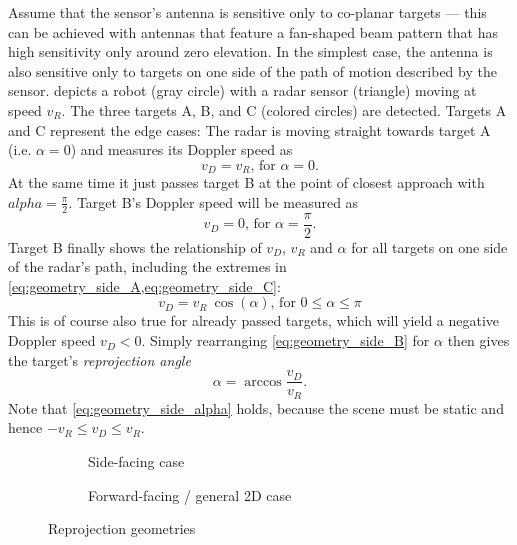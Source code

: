 Assume that the sensor's antenna is sensitive only to co-planar targets --- this can be achieved with antennas that feature a fan-shaped beam pattern that has high sensitivity only around zero elevation. In the simplest case, the antenna is also sensitive only to targets on one side of the path of motion described by the sensor.  depicts a robot (gray circle) with a radar sensor (triangle) moving at speed $v_R$. The three targets A, B, and C (colored circles) are detected. Targets A and C represent the edge cases: The radar is moving straight towards target A (i.e. $\alpha=0$) and measures its Doppler speed as
\begin{equation} \label{eq:geometry_side_A}
    v_D = v_R\text{, for }\alpha=0.
\end{equation}
At the same time it just passes target B at the point of closest approach with $alpha=\frac{\pi}{2}$. Target B's Doppler speed will be measured as
\begin{equation} \label{eq:geometry_side_C}
    v_D = 0\text{, for }\alpha=\frac{\pi}{2}.
\end{equation}
Target B finally shows the relationship of $v_D$, $v_R$ and $\alpha$ for all targets on one side of the radar's path, including the extremes in \cref{eq:geometry_side_A,eq:geometry_side_C}:
\begin{equation} \label{eq:geometry_side_B}
    v_D = v_R~\cos(\alpha)\text{, for }0 \leq \alpha \leq \pi
\end{equation}
This is of course also true for already passed targets, which will yield a negative Doppler speed $v_D < 0$. Simply rearranging \cref{eq:geometry_side_B} for $\alpha$ then gives the target's \textit{reprojection angle}
\begin{equation} \label{eq:geometry_side_alpha}
    \alpha = \arccos{\frac{v_D}{v_R}}.
\end{equation}
Note that \cref{eq:geometry_side_alpha} holds, because the scene must be static and hence $-v_R \leq v_D \leq v_R$.

\begin{figure}[htp]
    \centering
    \footnotesize
    \begin{subfigure}{0.45\textwidth}
        \def\svgwidth{\linewidth}
        
        \caption{Side-facing case}
        \label{fig:geometry-side}
    \end{subfigure}
    \hfill
    \begin{subfigure}{0.45\textwidth}
        \def\svgwidth{\linewidth}
        
        \caption{Forward-facing / general 2D case}
        \label{fig:geometry-forward}
    \end{subfigure}
    \caption{Reprojection geometries}
\end{figure}

